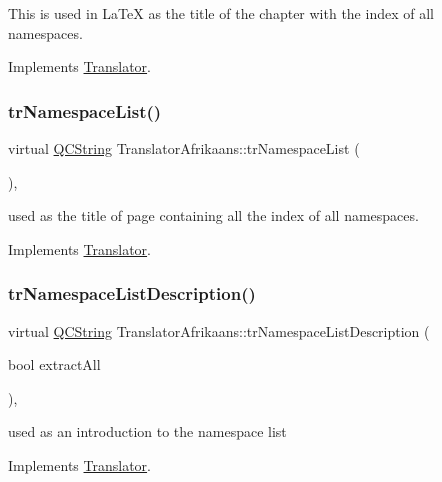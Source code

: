 This is used in La\+TeX as the title of the chapter with the index of all namespaces. 

Implements \mbox{\hyperlink{class_translator}{Translator}}.

\mbox{\label{class_translator_afrikaans_ad942fb97a12af4b27cfe66488ea0e2a8}} 
\subsubsection{\texorpdfstring{trNamespaceList()}{trNamespaceList()}}
{\footnotesize\ttfamily virtual \mbox{\hyperlink{class_q_c_string}{Q\+C\+String}} Translator\+Afrikaans\+::tr\+Namespace\+List (\begin{DoxyParamCaption}{ }\end{DoxyParamCaption})\hspace{0.3cm}{\ttfamily [inline]}, {\ttfamily [virtual]}}

used as the title of page containing all the index of all namespaces. 

Implements \mbox{\hyperlink{class_translator}{Translator}}.

\mbox{\label{class_translator_afrikaans_a0b58fb9c7ce335654efde2c3dfe94ded}} 
\subsubsection{\texorpdfstring{trNamespaceListDescription()}{trNamespaceListDescription()}}
{\footnotesize\ttfamily virtual \mbox{\hyperlink{class_q_c_string}{Q\+C\+String}} Translator\+Afrikaans\+::tr\+Namespace\+List\+Description (\begin{DoxyParamCaption}\item[{bool}]{extract\+All }\end{DoxyParamCaption})\hspace{0.3cm}{\ttfamily [inline]}, {\ttfamily [virtual]}}

used as an introduction to the namespace list 

Implements \mbox{\hyperlink{class_translator}{Translator}}.

